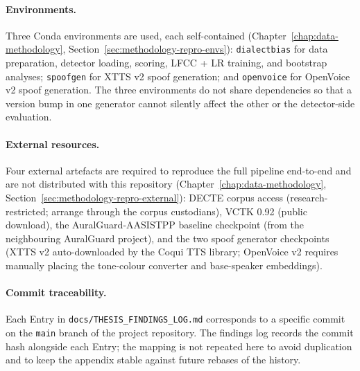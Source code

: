 \paragraph{Environments.}
Three Conda environments are used, each self-contained
(Chapter~\ref{chap:data-methodology}, Section~\ref{sec:methodology-repro-envs}):
\texttt{dialectbias} for data preparation, detector loading, scoring,
LFCC + LR training, and bootstrap analyses; \texttt{spoofgen} for
XTTS v2 spoof generation; and \texttt{openvoice} for OpenVoice v2
spoof generation. The three environments do not share dependencies
so that a version bump in one generator cannot silently affect the
other or the detector-side evaluation.

\paragraph{External resources.}
Four external artefacts are required to reproduce the full pipeline
end-to-end and are not distributed with this repository
(Chapter~\ref{chap:data-methodology}, Section~\ref{sec:methodology-repro-external}):
DECTE corpus access (research-restricted; arrange through the
corpus custodians), VCTK 0.92 (public download), the
AuralGuard-AASISTPP baseline checkpoint (from the neighbouring
AuralGuard project), and the two spoof generator checkpoints
(XTTS v2 auto-downloaded by the Coqui TTS library; OpenVoice v2
requires manually placing the tone-colour converter and
base-speaker embeddings).

\paragraph{Commit traceability.}
Each Entry in \texttt{docs/THESIS\_FINDINGS\_LOG.md} corresponds to
a specific commit on the \texttt{main} branch of the project
repository. The findings log records the commit hash alongside
each Entry; the mapping is not repeated here to avoid duplication
and to keep the appendix stable against future rebases of the
history.
